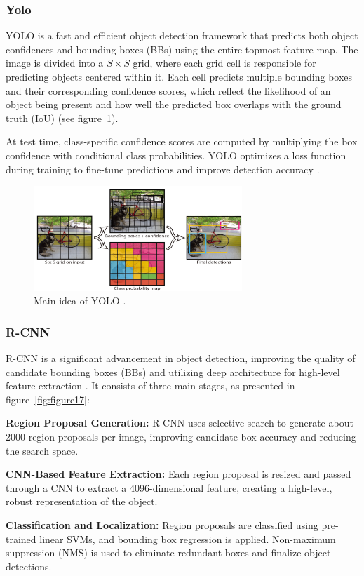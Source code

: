 \subsubsection{Yolo}
YOLO is a fast and efficient object detection framework that predicts both object confidences and bounding boxes (BBs) using the entire topmost feature map. The image is divided into a $S \times S$ grid, where each grid cell is responsible for predicting objects centered within it. Each cell predicts multiple bounding boxes and their corresponding confidence scores, which reflect the likelihood of an object being present and how well the predicted box overlaps with the ground truth (IoU) (see figure~\ref{fig:figure16}).

At test time, class-specific confidence scores are computed by multiplying the box confidence with conditional class probabilities. YOLO optimizes a loss function during training to fine-tune predictions and improve detection accuracy \parencite{zhao2019objectdetection}.

\begin{figure}[H] %
    \centering
    \includegraphics[width=0.7\textwidth]{chapters/chapter1/images/Figure16.png}
    \caption{Main idea of YOLO \parencite{zhao2019objectdetection}.}
    \label{fig:figure16}
\end{figure}

\subsubsection{R-CNN}
R-CNN is a significant advancement in object detection, improving the quality of candidate bounding boxes (BBs) and utilizing deep architecture for high-level feature extraction \parencite{zhao2019objectdetection}. It consists of three main stages, as presented in figure~\ref{fig:figure17}:

\begin{items}
    \item \textbf{Region Proposal Generation:} R-CNN uses selective search to generate about 2000 region proposals per image, improving candidate box accuracy and reducing the search space.
    \item \textbf{CNN-Based Feature Extraction:} Each region proposal is resized and passed through a CNN to extract a 4096-dimensional feature, creating a high-level, robust representation of the object.
    \item \textbf{Classification and Localization:} Region proposals are classified using pre-trained linear SVMs, and bounding box regression is applied. Non-maximum suppression (NMS) is used to eliminate redundant boxes and finalize object detections.
\end{items}

